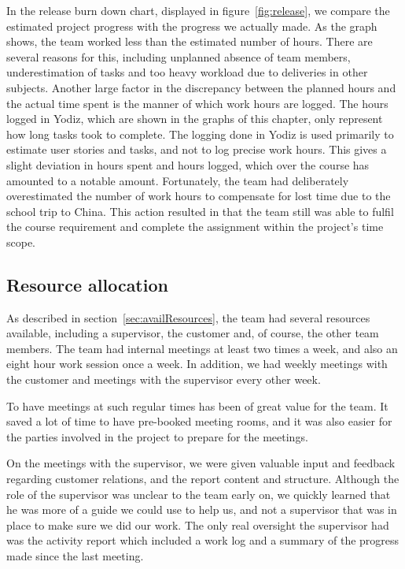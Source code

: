 \noindent In the release burn down chart, displayed in figure~\ref{fig:release}, we compare the estimated project progress with the progress we actually made. As the graph shows, the team worked less than the estimated number of hours. There are several reasons for this, including unplanned absence of team members, underestimation of tasks and too heavy workload due to deliveries in other subjects. Another large factor in the discrepancy between the planned hours and the actual time spent is the manner of which work hours are logged. The hours logged in Yodiz, which are shown in the graphs of this chapter, only represent how long tasks took to complete. The logging done in Yodiz is used primarily to estimate user stories and tasks, and not to log precise work hours. This gives a slight deviation in hours spent and hours logged, which over the course has amounted to a notable amount. Fortunately, the team had deliberately overestimated the number of work hours to compensate for lost time due to the school trip to China. This action resulted in that the team still was able to fulfil the course requirement and complete the assignment within the project's time scope.


\subsection{Resource allocation}
As described in section~\ref{sec:availResources}, the team had several resources available, including a supervisor, the customer and, of course, the other team members. The team had internal meetings at least two times a week, and also an eight hour work session once a week. In addition, we had weekly meetings with the customer and meetings with the supervisor every other week.

To have meetings at such regular times has been of great value for the team. It saved a lot of time to have pre-booked meeting rooms, and it was also easier for the parties involved in the project to prepare for the meetings.

On the meetings with the supervisor, we were given valuable input and feedback regarding customer relations, and the report content and structure. Although the role of the supervisor was unclear to the team early on, we quickly learned that he was more of a guide we could use to help us, and not a supervisor that was in place to make sure we did our work. The only real oversight the supervisor had was the activity report which included a work log and a summary of the progress made since the last meeting.

